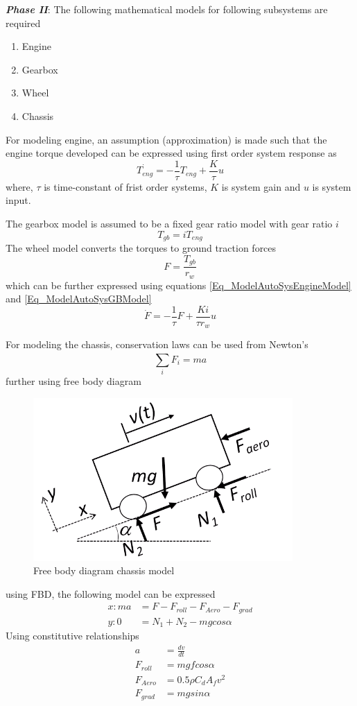 \textbf{\textit{Phase II}}: The following mathematical models for following subsystems are required
\begin{enumerate}
	\item Engine
	\item Gearbox
	\item Wheel
	\item Chassis
\end{enumerate}
For modeling engine, an assumption (approximation) is made such that the engine torque developed can be expressed using first order system response as
\begin{equation} \label{Eq_ModelAutoSysEngineModel}
	\dot{T_{eng}} = -\frac{1}{\tau} T_{eng} + \frac{K}{\tau} u
\end{equation}
where, $\tau$ is time-constant of frist order systems, $K$ is system gain and $u$ is system input. 

The gearbox model is assumed to be a fixed gear ratio model with gear ratio $i$
\begin{equation} \label{Eq_ModelAutoSysGBModel}
	T_{gb} = i T_{eng}
\end{equation}
The wheel model converts the torques to ground traction forces
\begin{equation}
	F = \frac{T_{gb}}{r_{w}}
\end{equation}
which can be further expressed using equations \eqref{Eq_ModelAutoSysEngineModel} and \eqref{Eq_ModelAutoSysGBModel}
\begin{equation} \label{Eq_ModelAutoSysWheel}
	\dot{F} = -\frac{1}{\tau} F + \frac{K i}{\tau r_w} u
\end{equation}

For modeling the chassis, conservation laws can be used from Newton's
\begin{equation}
	\sum_{i}^{} F_i = m a
\end{equation}
further using free body diagram
\begin{figure}[h!]
	\centering
	\includegraphics[width=0.5\linewidth]{Bilder/ModelAutoSystems_FBD}
	\caption{Free body diagram chassis model}
\end{figure}
using FBD, the following model can be expressed
\begin{align}
	x: m a &= F - F_{roll} - F_{Aero} - F_{grad} \label{Eq_ModelAutoSysFBDx} \\
	y: 0 &= N_{1} + N_{2} - m g cos\alpha
\end{align}
Using constitutive relationships
\begin{align}
	a &= \frac{dv}{dt} \\
	F_{roll} &= m g f cos\alpha \\
	F_{Aero} &= 0.5 \rho C_{d} A_{f} v^2 \\
	F_{grad} &= m g sin\alpha
\end{align}

